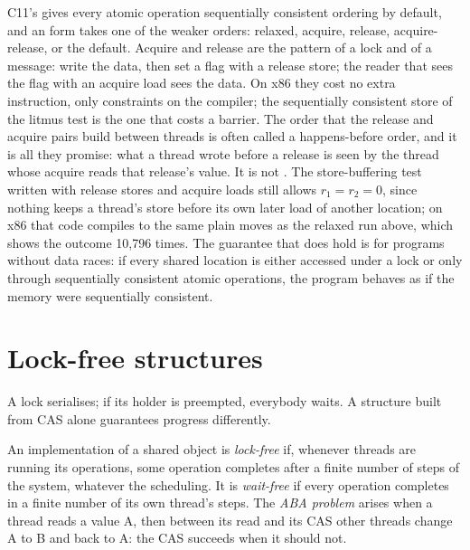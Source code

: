 C11's  gives every atomic operation sequentially consistent ordering by default, and an  form takes one of the weaker orders: relaxed, acquire, release, acquire-release, or the default. %
Acquire and release are the pattern of a lock and of a message: write the data, then set a flag with a release store; the reader that sees the flag with an acquire load sees the data. On x86 they cost no extra instruction, only constraints on the compiler; %
the sequentially consistent store of the litmus test is the one that costs a barrier. The order that the release and acquire pairs build between threads is often called a happens-before order, and it is all they promise: what a thread wrote before a release is seen by the thread whose acquire reads that release's value. It is not . The store-buffering test written with release stores and acquire loads still allows $r_1 = r_2 = 0$, since nothing keeps a thread's store before its own later load of another location; on x86 that code compiles to the same plain moves as the relaxed run above, which shows the outcome 10,796 times. The guarantee that does hold is for programs without data races: if every shared location is either accessed under a lock or only through sequentially consistent atomic operations, the program behaves as if the memory were sequentially consistent.

\section{Lock-free structures}\label{sec:b3:concurrency:lock-free}

A lock serialises; if its holder is preempted, everybody waits. A structure built from CAS alone guarantees progress differently.

\begin{definition}\label{def:b3:concurrency:lock-free}
An implementation of a shared object is \emph{lock-free} if, whenever threads are running its operations, some operation completes after a finite number of steps of the system, whatever the scheduling. It is \emph{wait-free} if every operation completes in a finite number of its own thread's steps. The \emph{ABA problem} arises when a thread reads a value A, then between its read and its CAS other threads change A to B and back to A: the CAS succeeds when it should not.
\end{definition}

